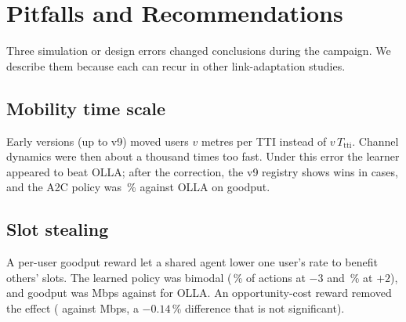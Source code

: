 \section{Pitfalls and Recommendations}\label{sec:pitfalls}
Three simulation or design errors changed conclusions during the campaign. We describe them because each can recur in other link-adaptation studies.

\subsection{Mobility time scale}
Early versions (up to v9) moved users $v$ metres per TTI instead of $v\,T_\mathrm{tti}$. Channel dynamics were then about a thousand times too fast. Under this error the learner appeared to beat OLLA; after the correction, the v9 registry shows \NVnineWins{} wins in \NVnineCases{} cases, and the A2C policy was \NVnineVsOLLA\,\% against OLLA on goodput.

\subsection{Slot stealing}
A per-user goodput reward let a shared agent lower one user's rate to benefit others' slots. The learned policy was bimodal (\NSlotMinusThree\,\% of actions at $-3$ and \NSlotPlusTwo\,\% at $+2$), and goodput was \NSlotRL{} Mbps against \NSlotOLLA{} for OLLA. An opportunity-cost reward removed the effect (\NSlotFixRL{} against \NSlotFixOLLA{} Mbps, a $-0.14$\,\% difference that is not significant).

